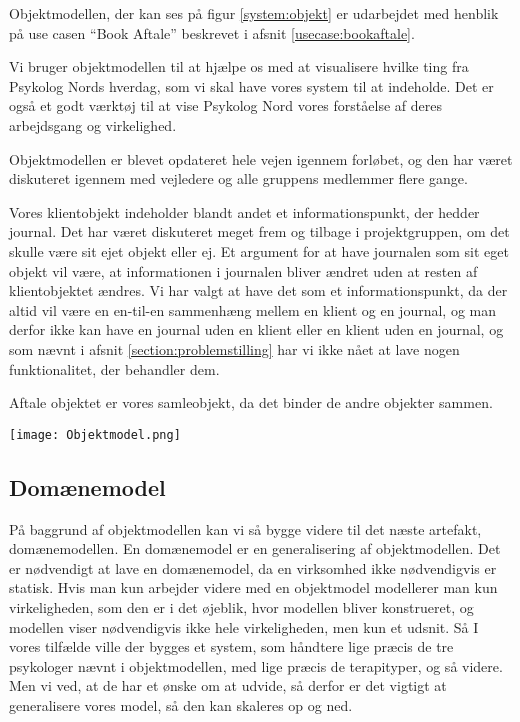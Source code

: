 Objektmodellen, der kan ses på figur \ref{system:objekt} er udarbejdet med henblik på use casen ``Book Aftale'' beskrevet i afsnit \ref{usecase:bookaftale}.

Vi bruger objektmodellen til at hjælpe os med at visualisere hvilke ting fra Psykolog Nords hverdag, som vi skal have vores system til at indeholde.
Det er også et godt værktøj til at vise Psykolog Nord vores forståelse af deres arbejdsgang og virkelighed.

Objektmodellen er blevet opdateret hele vejen igennem forløbet, og den har været diskuteret igennem med vejledere og alle gruppens medlemmer flere gange.

Vores klientobjekt indeholder blandt andet et informationspunkt, der hedder journal.
Det har været diskuteret meget frem og tilbage i projektgruppen, om det skulle være sit ejet objekt eller ej.
Et argument for at have journalen som sit eget objekt vil være, at informationen i journalen bliver ændret uden at resten af klientobjektet ændres.
Vi har valgt at have det som et informationspunkt, da der altid vil være en en-til-en sammenhæng mellem en klient og en journal, og man derfor ikke kan have en journal uden en klient eller en klient uden en journal, og som nævnt i afsnit \ref{section:problemstilling} har vi ikke nået at lave nogen funktionalitet, der behandler dem.

Aftale objektet er vores samleobjekt, da det binder de andre objekter sammen.

\begin{sidewaysfigure}
    \caption{Objektmodel for Book Aftale}
    \centering
        \texttt{[image: Objektmodel.png]}
    \label{system:objekt}
\end{sidewaysfigure}

\subsection{Domænemodel}
\label{domaenemodel}

På baggrund af objektmodellen kan vi så bygge videre til det næste artefakt, domænemodellen.
En domænemodel er en generalisering af objektmodellen.
Det er nødvendigt at lave en domænemodel, da en virksomhed ikke nødvendigvis er statisk.
Hvis man kun arbejder videre med en objektmodel modellerer man kun virkeligheden, som den er i det øjeblik, hvor modellen bliver konstrueret, og modellen viser nødvendigvis ikke hele virkeligheden, men kun et udsnit.
Så I vores tilfælde ville der bygges et system, som håndtere lige præcis de tre psykologer nævnt i objektmodellen, med lige præcis de terapityper, og så videre.
Men vi ved, at de har et ønske om at udvide, så derfor er det vigtigt at generalisere vores model, så den kan skaleres op og ned.

